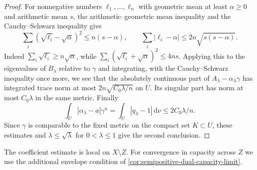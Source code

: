 \begin{proof}
For nonnegative numbers $\ell_1,\ldots,\ell_n$ with geometric mean at least $\alpha\geq0$ and arithmetic mean $s$, the arithmetic--geometric mean inequality and the Cauchy--Schwarz inequality give
\[
 \sum_i(\sqrt{\ell_i}-\sqrt\alpha)^2\leq n(s-\alpha),
 \qquad
 \sum_i|\ell_i-\alpha|\leq2n\sqrt{s(s-\alpha)}.
\]
Indeed $\sum_i\sqrt{\ell_i}\geq n\sqrt\alpha$, while
$\sum_i(\sqrt{\ell_i}+\sqrt\alpha)^2\leq4ns$.
Applying this to the eigenvalues of $B_\lambda$ relative to $\gamma$ and integrating, with the Cauchy--Schwarz inequality once more, we see that the absolutely continuous part of $A_\lambda-\alpha_\lambda\gamma$ has integrated trace norm at most $2n\sqrt{C_0\lambda/n}$ on $U$. Its singular part has norm at most $C_0\lambda$ in the same metric. Finally
\[
 \int_U|\alpha_\lambda-a|\gamma^n
   =\int_U|q_\lambda-1|\,\mathrm{d}\nu
   \leq2C_0\lambda/n.
\]
Since $\gamma$ is comparable to the fixed metric on the compact set $K\subset U$, these estimates and $\lambda\leq\sqrt\lambda$ for $0<\lambda\leq1$ give the second conclusion.
\end{proof}

The coefficient estimate is local on $X\setminus Z$. For convergence in capacity across $Z$ we use the additional envelope condition of \cref{cor:semipositive-dual-capacity-limit}.

